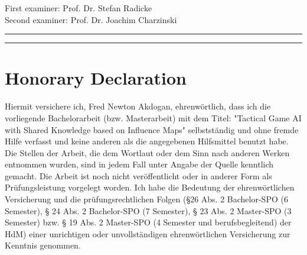 \documentclass[]{report}
\begin{document}
\begin{titlepage}
	\vfill %
	
	
	
	{\small First examiner: Prof. Dr. Stefan Radicke\\[0.5\baselineskip]}
	{\small Second examiner: Prof. Dr. Joachim Charzinski\\[0.5\baselineskip]}
	
	\vspace{0.1\textheight} %
	
	
	\rule{\textwidth}{0.4pt} %
	
	\vspace{2pt}\vspace{-\baselineskip} %
	
	\rule{\textwidth}{1pt} %
	
\end{titlepage}


\begin{abstract}
	
\end{abstract}
\newpage
\chapter*{Honorary Declaration}

Hiermit versichere ich, Fred Newton Akdogan, ehrenwörtlich, dass ich die
vorliegende Bachelorarbeit (bzw. Masterarbeit) mit dem Titel: "Tactical Game AI with Shared Knowledge based on Influence Maps" selbstständig und ohne fremde Hilfe verfasst und keine
anderen als die angegebenen Hilfsmittel benutzt habe. Die Stellen der Arbeit, die dem
Wortlaut oder dem Sinn nach anderen Werken entnommen wurden, sind in jedem Fall
unter Angabe der Quelle kenntlich gemacht. Die Arbeit ist noch nicht veröffentlicht oder
in anderer Form als Prüfungsleistung vorgelegt worden.
Ich habe die Bedeutung der ehrenwörtlichen Versicherung und die prüfungsrechtlichen
Folgen (§26 Abs. 2 Bachelor-SPO (6 Semester), § 24 Abs. 2 Bachelor-SPO (7 Semester), §
23 Abs. 2 Master-SPO (3 Semester) bzw. § 19 Abs. 2 Master-SPO (4 Semester und
berufsbegleitend) der HdM) einer unrichtigen oder unvollständigen ehrenwörtlichen
Versicherung zur Kenntnis genommen.
\end{document}
